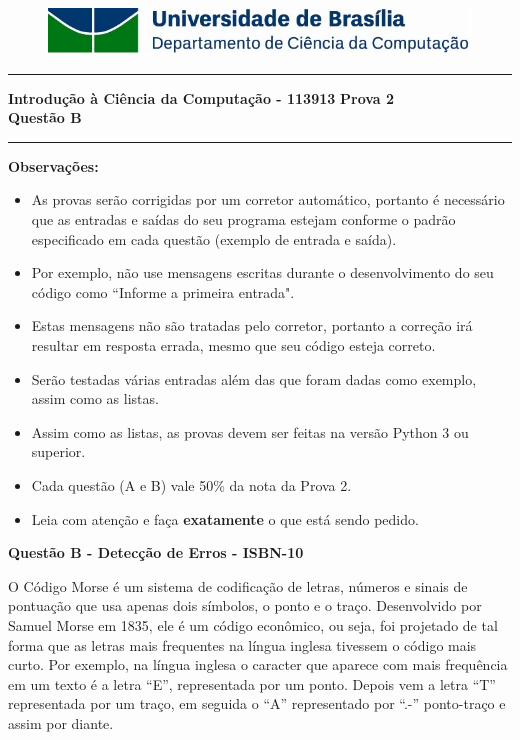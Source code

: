 \documentclass[a4paper, 12pt]{article}
\begin{document}
\begin{figure}[H]
	\includegraphics[scale=0.9]{UnB_CiC_Logo.jpg}
\end{figure}
\noindent\rule{\textwidth}{0.4pt}
\begin{center}
	\textbf{{\Large Introdução à Ciência da Computação - 113913}} \newline \newline
	\textbf{{\large Prova 2} \\
	\vspace{9pt}
	{\large Questão B}} \\
	\noindent\rule{\textwidth}{0.4pt}
	\newline
\end{center}

\textbf{{\large Observações:}}
\begin{itemize}
	\item As provas serão corrigidas por um corretor automático, portanto é necessário que as entradas e saídas do seu programa estejam conforme o padrão especificado em cada questão (exemplo de entrada e saída).
	\item Por exemplo, não use mensagens escritas durante o desenvolvimento do seu código como “Informe a primeira entrada".
	\item Estas mensagens não são tratadas pelo corretor, portanto a correção irá resultar em resposta errada, mesmo que seu código esteja correto.
	\item Serão testadas várias entradas além das que foram dadas como exemplo, assim como as listas.
	\item Assim como as listas, as provas devem ser feitas na versão Python 3 ou superior.
	\item Cada questão (A e B) vale 50\% da nota da Prova 2.
	\item Leia com atenção e faça \textbf{exatamente} o que está sendo pedido.


\end{itemize}
\newpage %
\begin{center}
\textbf{{\Large Questão B - Detecção de Erros - ISBN-10}}
\end{center}

\vspace{5pt} 

O Código Morse é um sistema de codificação de letras, números e sinais de pontuação que usa apenas dois símbolos, o ponto e o traço. Desenvolvido por Samuel Morse em 1835, ele é um código econômico, ou seja, foi projetado de tal forma que as letras mais frequentes na língua inglesa tivessem o código mais curto. Por exemplo, na língua inglesa o caracter que aparece com mais frequência em um texto é a letra “E”, representada por um ponto. Depois vem a letra “T” representada por um traço, em seguida o “A” representado por “.-” ponto-traço e assim por diante.
\end{document}

